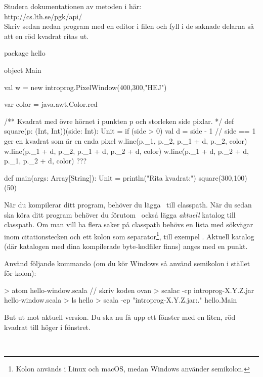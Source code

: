 \Subtask Studera dokumentationen av metoden  i  här:\\ \url{http://cs.lth.se/pgk/api/}
\\ Skriv sedan nedan program med en editor i filen  och fyll i de saknade delarna så att en röd kvadrat ritas ut.

\begin{Code}
package hello

object Main {
  val w = new introprog.PixelWindow(400,300,"HEJ")

  var color = java.awt.Color.red

  /** Kvadrat med övre hörnet i punkten p och storleken side pixlar. */
  def square(p: (Int, Int))(side: Int): Unit = if (side > 0) {
    val d = side - 1  // side == 1 ger en kvadrat som är en enda pixel
    w.line(p._1,     p._2,     p._1 + d, p._2,     color)
    w.line(p._1 + d, p._2,     p._1 + d, p._2 + d, color)
    w.line(p._1 + d, p._2 + d, p._1,     p._2 + d, color)
    ???
  }

  def main(args: Array[String]): Unit = {
    println("Rita kvadrat:")
    square(300,100)(50)
  }
}
\end{Code}

\noindent
När du kompilerar ditt program, behöver du lägga \LibJar~till classpath.
När du sedan ska köra ditt program behöver du förutom  \LibJar~också lägga \emph{aktuell} katalog till classpath. Om man vill ha flera saker på classpath behövs en lista med sökvägar inom citationstecken och ett kolon som separator\footnote{Kolon används i Linux och macOS, medan Windows använder semikolon.}, till exempel .
Aktuell katalog (där katalogen  med dina kompilerade byte-kodfiler finns) anges med en punkt.

Använd följande kommando (om du kör Windows så använd semikolon i stället för kolon):
\begin{REPL}
> atom hello-window.scala  // skriv koden ovan
> scalac -cp introprog-X.Y.Z.jar hello-window.scala
> ls hello
> scala -cp "introprog-X.Y.Z.jar:." hello.Main
\end{REPL}
\noindent But ut  mot aktuell version. Du ska nu få upp ett fönster med en liten, röd kvadrat till höger i fönstret.


\SOLUTION

\TaskSolved \what~

